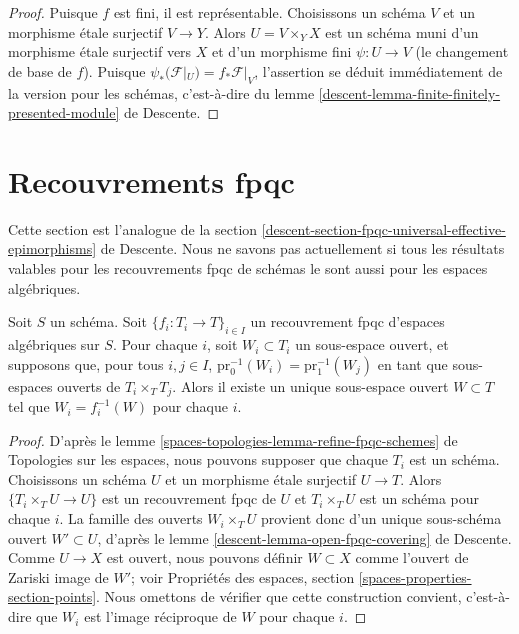 \begin{proof}
Puisque $f$ est fini, il est représentable. Choisissons un schéma $V$ et un
morphisme \'etale surjectif $V \to Y$. Alors $U = V \times_Y X$ est un schéma muni d'un
morphisme \'etale surjectif vers $X$ et d'un morphisme fini
$\psi : U \to V$ (le changement de base de $f$). Puisque
$\psi_*(\mathcal{F}|_U) = f_*\mathcal{F}|_V$,
l'assertion se déduit immédiatement de la version pour les schémas,
c'est-à-dire du
lemme \ref{descent-lemma-finite-finitely-presented-module} de Descente.
\end{proof}






\section{Recouvrements fpqc}
\label{section-fpqc}

\noindent
Cette section est l'analogue de la
section \ref{descent-section-fpqc-universal-effective-epimorphisms} de Descente.
Nous ne savons pas actuellement si tous les résultats valables pour les
recouvrements fpqc de schémas le sont aussi pour les espaces algébriques.

\begin{lemma}
\label{lemma-open-fpqc-covering}
Soit $S$ un schéma.
Soit $\{f_i : T_i \to T\}_{i \in I}$ un recouvrement fpqc
d'espaces algébriques sur $S$.
Pour chaque $i$, soit $W_i \subset T_i$ un sous-espace ouvert,
et supposons que, pour tous $i, j \in I$,
$\text{pr}_0^{-1}(W_i) = \text{pr}_1^{-1}(W_j)$ en tant que sous-espaces ouverts
de $T_i \times_T T_j$. Alors il existe un unique sous-espace ouvert
$W \subset T$ tel que $W_i = f_i^{-1}(W)$ pour chaque $i$.
\end{lemma}

\begin{proof}
D'après le
lemme \ref{spaces-topologies-lemma-refine-fpqc-schemes} de Topologies sur les espaces,
nous pouvons supposer que chaque $T_i$ est un schéma.
Choisissons un schéma $U$ et un morphisme \'etale surjectif $U \to T$.
Alors $\{T_i \times_T U \to U\}$ est un recouvrement fpqc de $U$
et $T_i \times_T U$ est un schéma pour chaque $i$. La famille
des ouverts $W_i \times_T U$ provient donc d'un unique
sous-schéma ouvert $W' \subset U$, d'après le
lemme \ref{descent-lemma-open-fpqc-covering} de Descente.
Comme $U \to X$ est ouvert, nous pouvons définir $W \subset X$ comme l'ouvert de Zariski
image de $W'$; voir
Propriétés des espaces, section \ref{spaces-properties-section-points}.
Nous omettons de vérifier que cette construction convient, c'est-à-dire que
$W_i$ est l'image réciproque de $W$ pour chaque $i$.
\end{proof}


